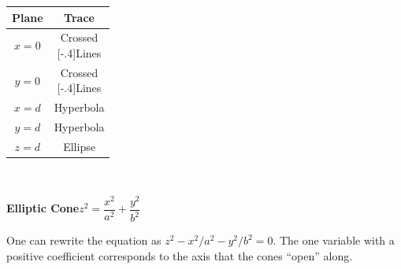 \noindent
\begin{minipage}{\ifbool{latexml}{1.5}{}\linewidth}
 \captionsetup{type=figure}%
 \noindent%
 \begin{minipage}[c]{.24\linewidth}
 \end{minipage}%
 \begin{minipage}[c]{.21\linewidth}
  \begin{tabular}{cc}
   \textbf{Plane}  & \textbf{Trace} \\\midrule
   $x=0$ & \parbox{5em}{\centering Crossed\\[-.4\baselineskip]Lines}\medskip\\
   $y=0$ & \parbox{5em}{\centering Crossed\\[-.4\baselineskip]Lines}\bigskip\\
   $x=d$ & Hyperbola\\
   $y=d$ & Hyperbola\\
   $z=d$ & Ellipse
  \end{tabular}
 \end{minipage}%
 \begin{minipage}[c]{\ifbool{latexml}{}{.55}\linewidth}
~%
 \end{minipage}
 \caption{\quad\textbf{Elliptic Cone}\qquad$z^2=\dfrac{x^2}{a^2}+\dfrac{y^2}{b^2}$}
 \label{fig_elliptic_cone}
 \bigskip
 \begin{minipage}{.75\linewidth}
  One can rewrite the equation as $z^2-x^2/a^2-y^2/{b^2} = 0$. The one variable with a positive coefficient corresponds to the axis that the cones ``open'' along. 
 \end{minipage}
\end{minipage}

\clearpage

